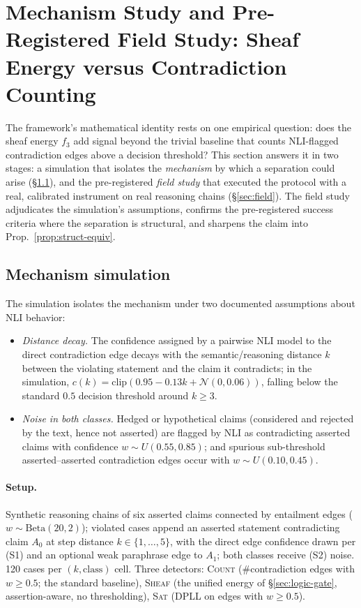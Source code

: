 \section{Mechanism Study and Pre-Registered Field Study: Sheaf Energy versus
Contradiction Counting}
\label{sec:mechanism}

The framework's mathematical identity rests on one empirical question: does
the sheaf energy $f_3$ add signal beyond the trivial baseline that counts
NLI-flagged contradiction edges above a decision threshold? This section
answers it in two stages: a simulation that isolates the \emph{mechanism} by
which a separation could arise (\S\ref{sec:simulation}),
and the pre-registered \emph{field study} that executed the protocol with a
real, calibrated instrument on real reasoning chains (\S\ref{sec:field}). The
field study adjudicates the simulation's assumptions, confirms
the pre-registered success criteria where the separation is structural, and
sharpens the claim into Prop.~\ref{prop:struct-equiv}.

\subsection{Mechanism simulation}
\label{sec:simulation}

The simulation isolates the mechanism under two documented assumptions about
NLI behavior:

\begin{itemize}
\item[(S1)] \emph{Distance decay.} The confidence assigned by a pairwise NLI
model to the direct contradiction edge decays with the semantic/reasoning
distance $k$ between the violating statement and the claim it contradicts; in
the simulation, $c(k)=\mathrm{clip}(0.95-0.13k+\mathcal N(0,0.06))$, falling
below the standard $0.5$ decision threshold around $k\ge 3$.
\item[(S2)] \emph{Noise in both classes.} Hedged or hypothetical claims
(considered and rejected by the text, hence not asserted) are flagged by NLI
as contradicting asserted claims with confidence $w\sim U(0.55,0.85)$; and
spurious sub-threshold asserted--asserted contradiction edges occur with
$w\sim U(0.10,0.45)$.
\end{itemize}

\paragraph{Setup.} Synthetic reasoning chains of six asserted claims connected
by entailment edges ($w\sim\mathrm{Beta}(20,2)$); violated cases append an
asserted statement contradicting claim $A_0$ at step distance
$k\in\{1,\dots,5\}$, with the direct edge confidence drawn per (S1) and an
optional weak paraphrase edge to $A_1$; both classes receive (S2) noise. 120
cases per $(k,\text{class})$ cell. Three detectors: \textsc{Count}
(\#contradiction edges with $w\ge 0.5$; the standard baseline), \textsc{Sheaf}
(the unified energy of \S\ref{sec:logic-gate}, assertion-aware, no
thresholding), \textsc{Sat} (DPLL on edges with $w\ge 0.5$).

